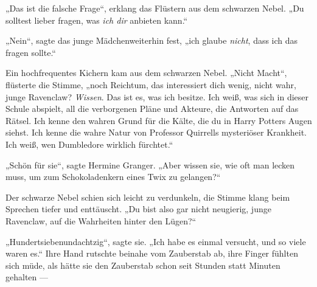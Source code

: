 „Das ist die falsche Frage“, erklang das Flüstern aus dem schwarzen Nebel.
„Du solltest lieber fragen, was \emph{ich dir} anbieten kann.“

„Nein“, sagte das junge Mädchenweiterhin fest, „ich glaube \emph{nicht}, dass ich das fragen sollte.“

Ein hochfrequentes Kichern kam aus dem schwarzen Nebel.
„Nicht Macht“, flüsterte die Stimme, „noch Reichtum, das interessiert dich wenig, nicht wahr, junge Ravenclaw? \emph{Wissen}. Das ist es, was ich besitze. Ich weiß, was sich in dieser Schule abspielt, all die verborgenen Pläne und Akteure, die Antworten auf das Rätsel. Ich kenne den wahren Grund für die Kälte, die du in Harry Potters Augen siehst. Ich kenne die wahre Natur von Professor Quirrells mysteriöser Krankheit. Ich weiß, wen Dumbledore wirklich fürchtet.“

„Schön für sie“, sagte Hermine Granger.
„Aber wissen sie, wie oft man lecken muss, um zum Schokoladenkern eines Twix zu gelangen?“

Der schwarze Nebel schien sich leicht zu verdunkeln, die Stimme klang beim Sprechen tiefer und enttäuscht.
„Du bist also gar nicht neugierig, junge Ravenclaw, auf die Wahrheiten hinter den Lügen?“

„Hundertsiebenundachtzig“, sagte sie.
„Ich habe es einmal versucht, und so viele waren es.“ Ihre Hand rutschte beinahe vom Zauberstab ab, ihre Finger fühlten sich müde, als hätte sie den Zauberstab schon seit Stunden statt Minuten gehalten —

